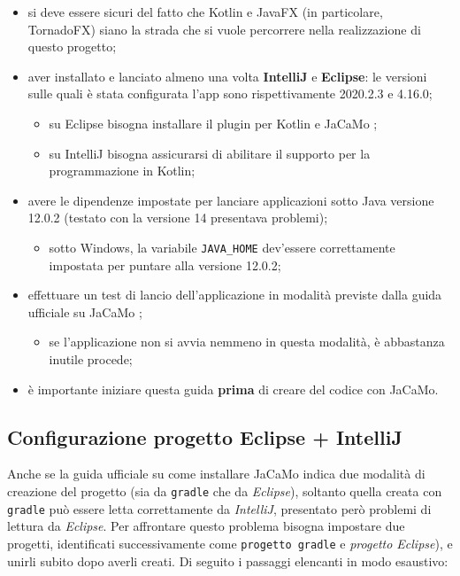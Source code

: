 \documentclass[12pt,a4paper,openright,oneside]{report}
\begin{document}
\begin{itemize}
	\item si deve essere sicuri del fatto che Kotlin e JavaFX (in particolare, TornadoFX) siano la strada che si vuole percorrere nella realizzazione di questo progetto;
	
	\item aver installato e lanciato almeno una volta \textbf{IntelliJ} e \textbf{Eclipse}: le versioni sulle quali è stata configurata l'app sono rispettivamente 2020.2.3 e 4.16.0;
	\begin{itemize}
		\item su Eclipse bisogna installare il plugin per Kotlin e JaCaMo \cite{eclipse};
		
		\item su IntelliJ bisogna assicurarsi di abilitare il supporto per la programmazione in Kotlin;
	\end{itemize}

	\item avere le dipendenze impostate per lanciare applicazioni sotto Java versione 12.0.2 (testato con la versione 14 presentava problemi);
	\begin{itemize}
		\item sotto Windows, la variabile \texttt{JAVA\_HOME} dev'essere correttamente impostata per puntare alla versione 12.0.2;
	\end{itemize}

	\item effettuare un test di lancio dell'applicazione in modalità previste dalla guida ufficiale su JaCaMo \cite{jacamo};
	\begin{itemize}
		\item se l'applicazione non si avvia nemmeno in questa modalità, è abbastanza inutile procede;
	\end{itemize}
	
	\item è importante iniziare questa guida \textbf{prima} di creare del codice con JaCaMo.
\end{itemize}

\subsection{Configurazione progetto Eclipse + IntelliJ}
Anche se la guida ufficiale su come installare JaCaMo indica due modalità di creazione del progetto (sia da \texttt{gradle} che da \textit{Eclipse}), soltanto quella creata con \texttt{gradle} può essere letta correttamente da \textit{IntelliJ}, presentato però problemi di lettura da \textit{Eclipse}. Per affrontare questo problema bisogna impostare due progetti, identificati successivamente come \texttt{progetto gradle} e \textit{progetto Eclipse}), e unirli subito dopo averli creati. Di seguito i passaggi elencanti in modo esaustivo:
\end{document}
